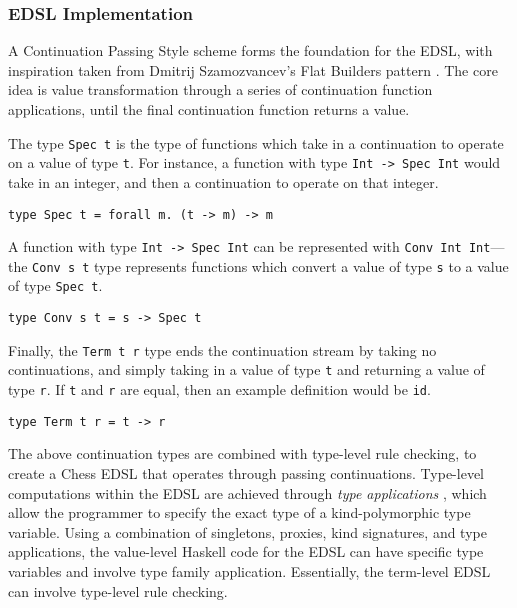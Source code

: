 \documentclass[12pt, a4paper, bibliography=totocnumbered]{scrartcl}
\begin{document}
\subsubsection{EDSL Implementation}

A Continuation Passing Style \cite{cps} scheme forms the foundation for the EDSL, with inspiration taken from Dmitrij Szamozvancev's Flat Builders pattern \cite{mezzo}. The core idea is value transformation through a series of continuation function applications, until the final continuation function returns a value.

The type \lstinline{Spec t} is the type of functions which take in a continuation to operate on a value of type \lstinline{t}. For instance, a function with type \lstinline{Int -> Spec Int} would take in an integer, and then a continuation to operate on that integer.

\begin{lstlisting}
type Spec t = forall m. (t -> m) -> m
\end{lstlisting}

A function with type \lstinline{Int -> Spec Int} can be represented with \lstinline{Conv Int Int}---the \lstinline{Conv s t} type represents functions which convert a value of type \lstinline{s} to a value of type \lstinline{Spec t}.

\begin{lstlisting}
type Conv s t = s -> Spec t
\end{lstlisting}

Finally, the \lstinline{Term t r} type ends the continuation stream by taking no continuations, and simply taking in a value of type \lstinline{t} and returning a value of type \lstinline{r}. If \lstinline{t} and \lstinline{r} are equal, then an example definition would be \lstinline{id}.

\begin{lstlisting}
type Term t r = t -> r
\end{lstlisting}

The above continuation types are combined with type-level rule checking, to create a Chess EDSL that operates through passing continuations. Type-level computations within the EDSL are achieved through \emph{type applications} \cite{typeapplication}, which allow the programmer to specify the exact type of a kind-polymorphic type variable. Using a combination of singletons, proxies, kind signatures, and type applications, the value-level Haskell code for the EDSL can have specific type variables and involve type family application. Essentially, the term-level EDSL can involve type-level rule checking.
\end{document}
